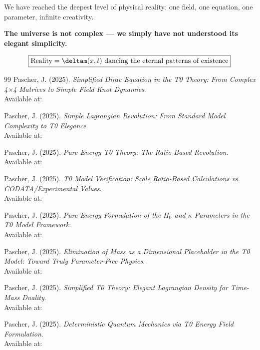 	We have reached the deepest level of physical reality: one field, one equation, one parameter, infinite creativity.
	
	\textbf{The universe is not complex --- we simply have not understood its elegant simplicity.}
	
	\begin{equation}
		\boxed{\text{Reality} = \deltam(x,t) \text{ dancing the eternal patterns of existence}}
		\label{eq:final_truth}
	\end{equation}
	
	\begin{thebibliography}{99}
		Pascher, J. (2025). \textit{Simplified Dirac Equation in the T0 Theory: From Complex 4×4 Matrices to Simple Field Knot Dynamics}. \\
		Available at: 
		
		Pascher, J. (2025). \textit{Simple Lagrangian Revolution: From Standard Model Complexity to T0 Elegance}. \\
		Available at: 
		
		Pascher, J. (2025). \textit{Pure Energy T0 Theory: The Ratio-Based Revolution}. \\
		Available at: 
		
		Pascher, J. (2025). \textit{T0 Model Verification: Scale Ratio-Based Calculations vs. CODATA/Experimental Values}. \\
		Available at: 
		
		Pascher, J. (2025). \textit{Pure Energy Formulation of the $H_0$ and $\kappa$ Parameters in the T0 Model Framework}. \\
		Available at: 
		
		Pascher, J. (2025). \textit{Elimination of Mass as a Dimensional Placeholder in the T0 Model: Toward Truly Parameter-Free Physics}. \\
		Available at: 
		
		Pascher, J. (2025). \textit{Simplified T0 Theory: Elegant Lagrangian Density for Time-Mass Duality}. \\
		Available at: 
		
		Pascher, J. (2025). \textit{Deterministic Quantum Mechanics via T0 Energy Field Formulation}. \\
		Available at: 
		

\end{thebibliography}
